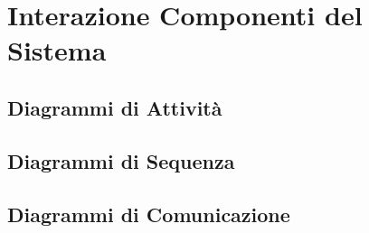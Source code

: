 
\section{Interazione Componenti del Sistema}

\subsection{Diagrammi di Attività}



\subsection{Diagrammi di Sequenza}



\subsection{Diagrammi di Comunicazione}


